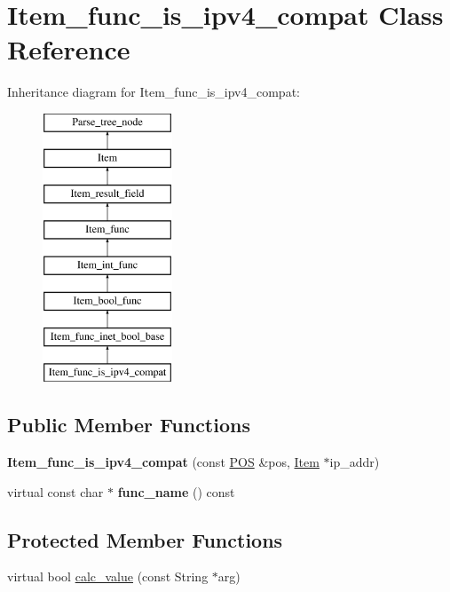\hypertarget{classItem__func__is__ipv4__compat}{}\section{Item\+\_\+func\+\_\+is\+\_\+ipv4\+\_\+compat Class Reference}
\label{classItem__func__is__ipv4__compat}
Inheritance diagram for Item\+\_\+func\+\_\+is\+\_\+ipv4\+\_\+compat\+:\begin{figure}[H]
\begin{center}
\leavevmode
\includegraphics[height=8.000000cm]{classItem__func__is__ipv4__compat}
\end{center}
\end{figure}
\subsection*{Public Member Functions}
\begin{DoxyCompactItemize}
\item 
\mbox{\label{classItem__func__is__ipv4__compat_a8259b53e2c39a087d84116a804c06d77}} 
{\bfseries Item\+\_\+func\+\_\+is\+\_\+ipv4\+\_\+compat} (const \mbox{\hyperlink{structYYLTYPE}{P\+OS}} \&pos, \mbox{\hyperlink{classItem}{Item}} $\ast$ip\+\_\+addr)
\item 
\mbox{\label{classItem__func__is__ipv4__compat_a8889970456cb3fc0f95c3b7f0d5c1474}} 
virtual const char $\ast$ {\bfseries func\+\_\+name} () const
\end{DoxyCompactItemize}
\subsection*{Protected Member Functions}
\begin{DoxyCompactItemize}
\item 
virtual bool \mbox{\hyperlink{classItem__func__is__ipv4__compat_a5138af46bb5cff4334b4d746f0d680cf}{calc\+\_\+value}} (const String $\ast$arg)
\end{DoxyCompactItemize}
